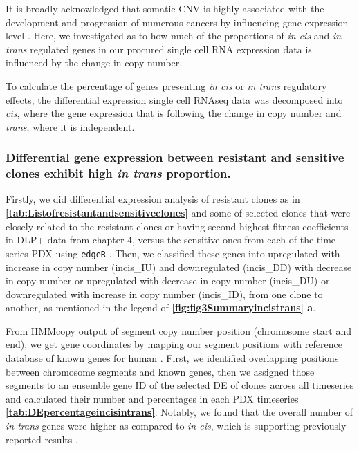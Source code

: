It is broadly acknowledged that somatic CNV is highly associated with the development and progression of numerous cancers by influencing gene expression level \cite{yang2017prame, gut2018sox2}. 
Here, we investigated as to how much of the proportions of \textit{in cis} and \textit{in trans} regulated genes in our procured single cell RNA expression data is influenced by the change in copy number.

To calculate the percentage of genes presenting \textit{in cis} or \textit{in trans} regulatory effects, the differential expression single cell RNAseq data was decomposed into \textit{cis}, where the gene expression that is following the change in copy number and \textit{trans}, where it is independent.

\subsubsection{Differential gene expression between resistant and sensitive clones exhibit high \textit{in trans} proportion.}

Firstly, we did differential expression analysis of resistant clones as in \textbf{\autoref{tab:Listofresistantandsensitiveclones}} and some of selected clones that were closely related to the resistant clones or having second highest fitness coefficients in DLP+ data from chapter 4, versus the sensitive ones from each of the time series PDX using \texttt{edgeR} \cite{robinson2010edger}. Then, we classified these genes into upregulated with increase in copy number (incis\_IU) and downregulated (incis\_DD) with decrease in copy number or upregulated with decrease in copy number (incis\_DU) or downregulated with increase in copy number (incis\_ID), from one clone to another, as mentioned in the legend of \textbf{\autoref{fig:fig3Summaryincistrans} a}.

From HMMcopy output of segment copy number position (chromosome start and end), we get gene coordinates by mapping our segment positions with reference database of known genes for human  \cite{carlson2015txdb}. First, we identified overlapping positions between chromosome segments and known genes, then we assigned those segments to an ensemble gene ID \cite{rainer2019ensembldb} of the  selected \ac{DE} of clones across all timeseries and calculated their number and percentages in each PDX timeseries  \textbf{\autoref{tab:DEpercentageincisintrans}}. Notably, we found that the overall number of \textit{in trans} genes were higher as compared to \textit{in cis}, which is supporting previously reported results \cite{shao2019copy}. 

